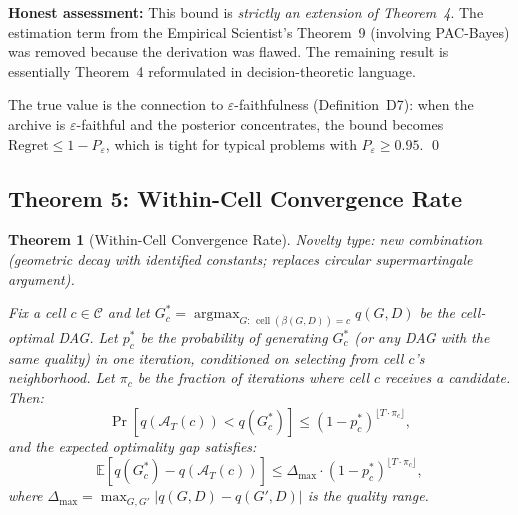 \documentclass{article}
\theoremstyle{definition}
\theoremstyle{plain}
\newtheorem{theorem}{Theorem}
\theoremstyle{remark}
\DeclareMathOperator*{\argmax}{argmax}
\DeclareMathOperator{\cell}{cell}
\begin{document}
\textbf{Honest assessment:} This bound is \emph{strictly an extension of Theorem~4}.
The estimation term from the Empirical Scientist's Theorem~9 (involving PAC-Bayes)
was removed because the derivation was flawed. The remaining result is essentially
Theorem~4 reformulated in decision-theoretic language.

The true value is the connection to $\varepsilon$-faithfulness (Definition~D7):
when the archive is $\varepsilon$-faithful and the posterior concentrates, the bound
becomes $\mathrm{Regret} \leq 1 - P_\varepsilon$, which is tight for typical problems
with $P_\varepsilon \geq 0.95$. \qed

\subsection{Theorem 5: Within-Cell Convergence Rate}

\begin{theorem}[Within-Cell Convergence Rate]
\label{thm:convergence}
\emph{Novelty type: new combination (geometric decay with identified constants;
replaces circular supermartingale argument).}

Fix a cell $c \in \mathcal{C}$ and let
$G_c^* = \argmax_{G:\, \cell(\beta(G,D))=c} q(G, D)$ be the cell-optimal DAG.
Let $p_c^*$ be the probability of generating $G_c^*$ (or any DAG with the same
quality) in one iteration, conditioned on selecting from cell $c$'s neighborhood.
Let $\pi_c$ be the fraction of iterations where cell $c$ receives a candidate.
Then:
\begin{equation}
  \label{eq:convergence}
  \Pr[q(\mathcal{A}_T(c)) < q(G_c^*)]
  \leq (1 - p_c^*)^{\lfloor T \cdot \pi_c \rfloor},
\end{equation}
and the expected optimality gap satisfies:
\begin{equation}
  \label{eq:gap}
  \mathbb{E}[q(G_c^*) - q(\mathcal{A}_T(c))]
  \leq \Delta_{\max} \cdot (1 - p_c^*)^{\lfloor T \cdot \pi_c \rfloor},
\end{equation}
where $\Delta_{\max} = \max_{G,G'} |q(G,D) - q(G',D)|$ is the quality range.
\end{theorem}
\end{document}
